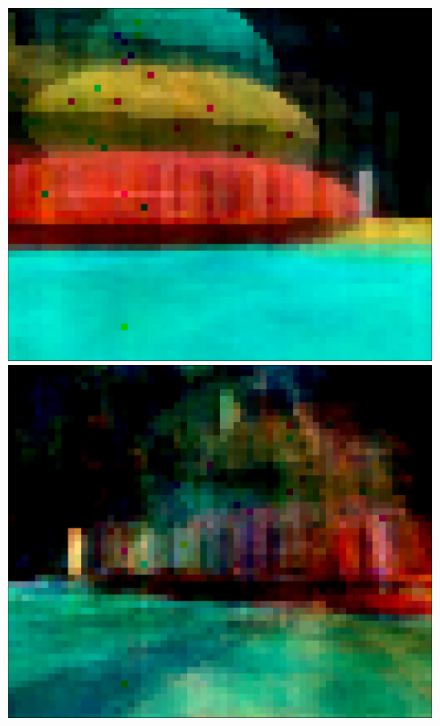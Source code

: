 \begin{figure}[p]
  \centering
  \includegraphics[width=\imgWithTripple, width=\imgWithTripple]{images/workflow/object_morphing/Morph1.png} \\[\picVdist]
  \includegraphics[width=\imgWithTripple, width=\imgWithTripple]{images/workflow/object_morphing/Morph2.png} \\[\picVdist]

\end{figure}
